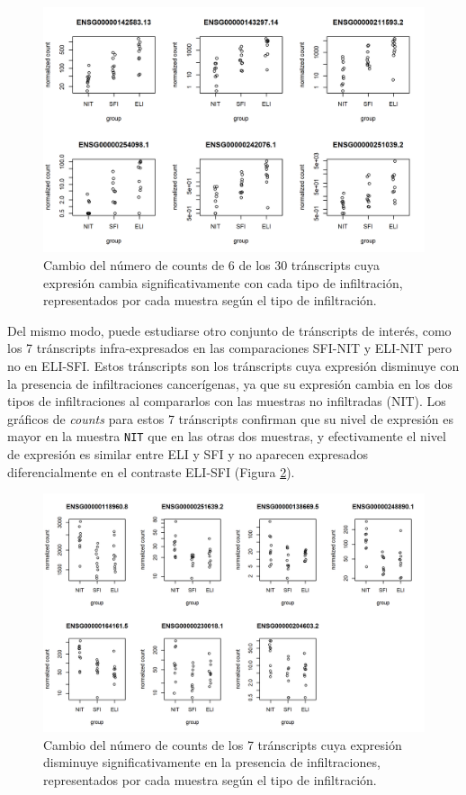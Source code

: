 \documentclass[
]{article}
\begin{document}
\begin{figure}

{\centering \includegraphics[width=0.8\linewidth]{results/5.CompComp/3.VennCts2} 

}

\caption{Cambio del número de counts de 6 de los 30 tránscripts cuya expresión cambia significativamente con cada tipo de infiltración, representados por cada muestra según el tipo de infiltración.}\label{fig:Fig14}
\end{figure}

Del mismo modo, puede estudiarse otro conjunto de tránscripts de
interés, como los 7 tránscripts infra-expresados en las comparaciones
SFI-NIT y ELI-NIT pero no en ELI-SFI. Estos tránscripts son los
tránscripts cuya expresión disminuye con la presencia de infiltraciones
cancerígenas, ya que su expresión cambia en los dos tipos de
infiltraciones al compararlos con las muestras no infiltradas (NIT). Los
gráficos de \emph{counts} para estos 7 tránscripts confirman que su
nivel de expresión es mayor en la muestra \texttt{NIT} que en las otras
dos muestras, y efectivamente el nivel de expresión es similar entre ELI
y SFI y no aparecen expresados diferencialmente en el contraste ELI-SFI
(Figura \ref{fig:Fig15}).

\begin{figure}

{\centering \includegraphics[width=0.8\linewidth]{results/5.CompComp/2.VennCts} 

}

\caption{Cambio del número de counts de los 7 tránscripts cuya expresión disminuye significativamente en la presencia de infiltraciones, representados por cada muestra según el tipo de infiltración.}\label{fig:Fig15}
\end{figure}
\end{document}
